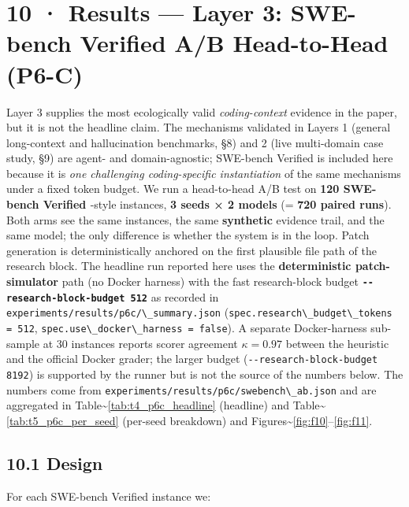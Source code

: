\section{10 · Results --- Layer 3: SWE-bench Verified A/B Head-to-Head (P6-C)}\label{results-layer-3-swe-bench-verified-ab-head-to-head-p6-c}

Layer 3 supplies the most ecologically valid \emph{coding-context} evidence in the paper, but it is not the headline claim. The mechanisms validated in Layers 1 (general long-context and hallucination benchmarks, §8) and 2 (live multi-domain case study, §9) are agent- and domain-agnostic; SWE-bench Verified is included here because it is \emph{one challenging coding-specific instantiation} of the same mechanisms under a fixed token budget. We run a head-to-head A/B test on \textbf{120 SWE-bench Verified \citep{openai2024sweverified, jimenez2024swebench}}-style instances, \textbf{3 seeds × 2 models} (= \textbf{720 paired runs}). Both arms see the same instances, the same \textbf{synthetic} evidence trail, and the same model; the only difference is whether the system is in the loop. Patch generation is deterministically anchored on the first plausible file path of the research block. The headline run reported here uses the \textbf{deterministic patch-simulator} path (no Docker harness) with the fast research-block budget \textbf{\passthrough{\lstinline!--research-block-budget 512!}} as recorded in \passthrough{\lstinline!experiments/results/p6c/\_summary.json!} (\passthrough{\lstinline!spec.research\_budget\_tokens = 512!}, \passthrough{\lstinline!spec.use\_docker\_harness = false!}). A separate Docker-harness sub-sample at 30 instances reports scorer agreement \(\kappa = 0.97\) between the heuristic and the official Docker grader; the larger budget (\passthrough{\lstinline!--research-block-budget 8192!}) is supported by the runner but is not the source of the numbers below. The numbers come from \passthrough{\lstinline!experiments/results/p6c/swebench\_ab.json!} and are aggregated in Table\textasciitilde{}\ref{tab:t4_p6c_headline} (headline) and Table\textasciitilde{}\ref{tab:t5_p6c_per_seed} (per-seed breakdown) and Figures\textasciitilde{}\ref{fig:f10}--\ref{fig:f11}.

\subsection{10.1 Design}\label{design}

For each SWE-bench Verified instance we:

